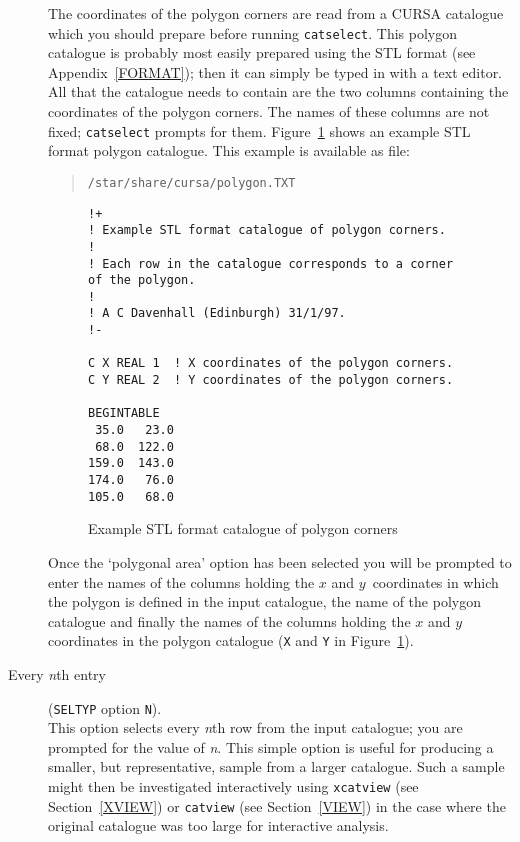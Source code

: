 \documentclass[twoside,11pt]{article}
\renewcommand{\_}{\texttt{\symbol{95}}}
\begin{document}
\begin{description}
   The coordinates of the polygon corners are read from a CURSA
   catalogue which you should prepare before running {\tt catselect}.
   This polygon catalogue is probably most easily prepared using the
   STL format (see Appendix~\ref{FORMAT}); then it can simply be typed in
   with a text editor.
   All that the catalogue needs to contain are the two columns
   containing the coordinates of the polygon corners.  The names of
   these columns are not fixed; {\tt catselect} prompts for them.
   Figure~\ref{POLY} shows an example STL format polygon catalogue.
   This example is available as file:

  \begin{verse}
   {\tt /star/share/cursa/polygon.TXT}
  \end{verse}

  \begin{figure}[htbp]

  \begin{verbatim}
!+
! Example STL format catalogue of polygon corners.
!
! Each row in the catalogue corresponds to a corner of the polygon.
!
! A C Davenhall (Edinburgh) 31/1/97.
!-

C X REAL 1  ! X coordinates of the polygon corners.
C Y REAL 2  ! Y coordinates of the polygon corners.

BEGINTABLE
 35.0   23.0
 68.0  122.0
159.0  143.0
174.0   76.0
105.0   68.0
  \end{verbatim}

  \caption{Example STL format catalogue of polygon corners
  \label{POLY} }

  \end{figure}

   Once the `polygonal area' option has been selected you will be
   prompted to enter the names of the columns holding the $x$\/ and
   $y$\, coordinates in which the polygon is defined in the input
   catalogue, the name of the polygon catalogue and finally the names
   of the columns holding the $x$\/ and $y$\/ coordinates in the polygon
   catalogue ({\tt X} and {\tt Y} in Figure~\ref{POLY}).

  \item[Every {\it n}th entry] ({\tt SELTYP} option {\tt N}). \\
   This option selects every {\it n}th row from the input catalogue; you
   are prompted for the value of {\it n}.  This simple option is useful
   for producing a smaller, but representative, sample from a larger
   catalogue.  Such a sample might then be investigated interactively using
   {\tt xcatview} (see Section~\ref{XVIEW}) or {\tt catview} (see
   Section~\ref{VIEW}) in the case where the original catalogue was too
   large for interactive analysis.

\end{description}
\end{document}

